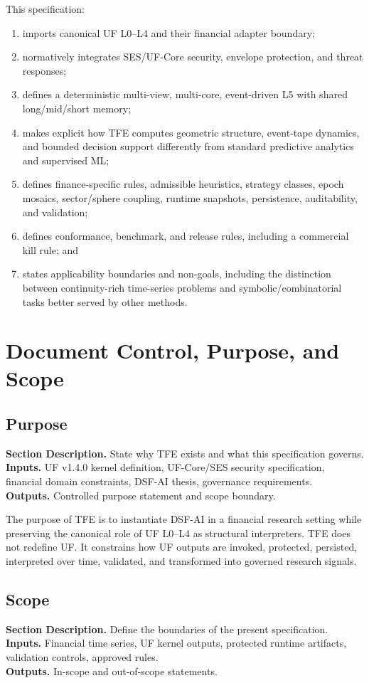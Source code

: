 \documentclass[11pt]{report}
\newcommand{\meta}[3]{\textbf{Section Description.} #1\\
\textbf{Inputs.} #2\\
\textbf{Outputs.} #3\par}
\begin{document}
This specification:
\begin{enumerate}[leftmargin=1.2cm]
    \item imports canonical UF L0--L4 and their financial adapter boundary;
    \item normatively integrates SES/UF-Core security, envelope protection, and threat responses;
    \item defines a deterministic multi-view, multi-core, event-driven L5 with shared long/mid/short memory;
    \item makes explicit how TFE computes geometric structure, event-tape dynamics, and bounded decision support differently from standard predictive analytics and supervised ML;
    \item defines finance-specific rules, admissible heuristics, strategy classes, epoch mosaics, sector/sphere coupling, runtime snapshots, persistence, auditability, and validation;
    \item defines conformance, benchmark, and release rules, including a commercial kill rule; and
    \item states applicability boundaries and non-goals, including the distinction between continuity-rich time-series problems and symbolic/combinatorial tasks better served by other methods.
\end{enumerate}

\chapter{Document Control, Purpose, and Scope}
\section{Purpose}
\meta{State why TFE exists and what this specification governs.}{UF v1.4.0 kernel definition, UF-Core/SES security specification, financial domain constraints, DSF-AI thesis, governance requirements.}{Controlled purpose statement and scope boundary.}

The purpose of TFE is to instantiate DSF-AI in a financial research setting while preserving the canonical role of UF L0--L4 as structural interpreters. TFE does not redefine UF. It constrains how UF outputs are invoked, protected, persisted, interpreted over time, validated, and transformed into governed research signals.

\section{Scope}
\meta{Define the boundaries of the present specification.}{Financial time series, UF kernel outputs, protected runtime artifacts, validation controls, approved rules.}{In-scope and out-of-scope statements.}
\end{document}
